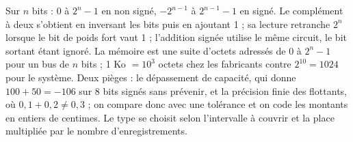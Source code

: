 \begin{aretirer}
Sur $n$ bits : $0$ à $2^{n}-1$ en non signé, $-2^{n-1}$ à $2^{n-1}-1$ en signé. Le complément à deux s'obtient en inversant les bits puis en ajoutant 1 ; sa lecture retranche $2^{n}$ lorsque le bit de poids fort vaut 1 ; l'addition signée utilise le même circuit, le bit sortant étant ignoré. La mémoire est une suite d'octets adressés de 0 à $2^{n}-1$ pour un bus de $n$ bits ; 1 Ko $= 10^{3}$ octets chez les fabricants contre $2^{10} = 1024$ pour le système. Deux pièges : le dépassement de capacité, qui donne $100 + 50 = -106$ sur 8 bits signés sans prévenir, et la précision finie des flottants, où $0{,}1 + 0{,}2 \neq 0{,}3$ ; on compare donc avec une tolérance et on code les montants en entiers de centimes. Le type se choisit selon l'intervalle à couvrir et la place multipliée par le nombre d'enregistrements.
\end{aretirer}
